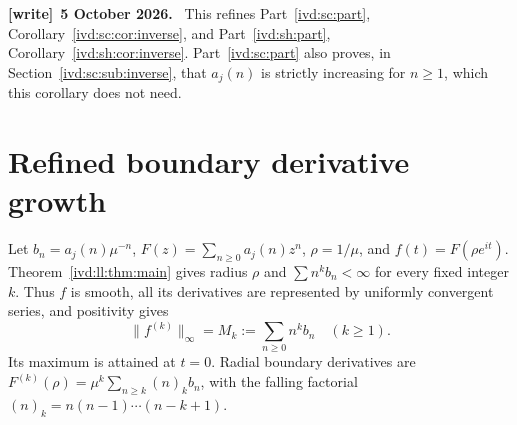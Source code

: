 \documentclass[11pt,letterpaper]{article}
\theoremstyle{remark}\newtheorem{remark}[theorem]{Remark}
\numberwithin{equation}{section}
\newenvironment{writenote}[1][]{\par\smallskip\begingroup\small
 \noindent\textbf{[write]}\if\relax\detokenize{#1}\relax\else~\textbf{#1.}\fi\ }%
 {\par\endgroup\smallskip}
\begin{document}
\begin{writenote}[5 October 2026]
This refines Part~\ref{ivd:sc:part}, Corollary~\ref{ivd:sc:cor:inverse}, and Part~\ref{ivd:sh:part}, Corollary~\ref{ivd:sh:cor:inverse}. Part~\ref{ivd:sc:part} also proves, in Section~\ref{ivd:sc:sub:inverse}, that $a_j(n)$ is strictly increasing for $n\ge1$, which this corollary does not need.
\end{writenote}

\section{Refined boundary derivative growth}\label{ivd:ll:sec:derivatives}
Let $b_n=a_j(n)\mu^{-n}$, $F(z)=\sum_{n\ge0}a_j(n)z^n$,
$\rho=1/\mu$, and $f(t)=F(\rho e^{it})$. Theorem~\ref{ivd:ll:thm:main}
gives radius $\rho$ and $\sum n^k b_n<\infty$ for every fixed
integer $k$. Thus $f$ is smooth, all its derivatives are represented
by uniformly convergent series, and positivity gives
\begin{equation}\label{ivd:ll:eq:moment-norm}
 \|f^{(k)}\|_\infty=M_k:=\sum_{n\ge0}n^k b_n\quad(k\ge1).
\end{equation}
Its maximum is attained at $t=0$. Radial boundary derivatives are
$F^{(k)}(\rho)=\mu^k\sum_{n\ge k}(n)_k b_n$, with the falling
factorial $(n)_k=n(n-1)\cdots(n-k+1)$.
\end{document}
